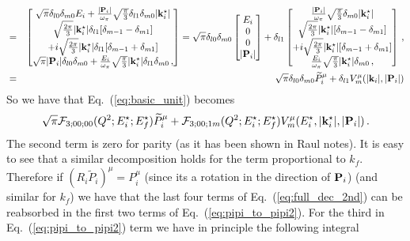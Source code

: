 {\begin{eqnarray}
&=&\begin{bmatrix} \sqrt{\pi}\delta_{l0}\delta_{m0}E_i + \tfrac{|\textbf{P}_i|}{\omega_\pi}\sqrt{\frac{\pi}{3}} \delta_{l1}\delta_{m 0}|{\bf k}^\star_i| \\ \sqrt{\frac{2 \pi}{3}} |{\bf k}^\star_i| \delta_{l1}[\delta_{m-1}-\delta_{m1}] \\ +i\sqrt{\frac{2 \pi}{3}} |{\bf k}^\star_i| \delta_{l1}[\delta_{m-1}+\delta_{m1}]  \\ \sqrt{\pi}|\textbf{P}_i|\delta_{l0} \delta_{m 0} + \tfrac{E_i}{\omega_\pi} \sqrt{\frac{\pi}{3}}|{\bf k}_i^\star|\delta_{l1}\delta_{m 0}\, , \end{bmatrix}=\sqrt{\pi}\delta_{l0}\delta_{m 0}\begin{bmatrix}
E_i\\ 0 \\ 0 \\|{\bf P}_i|
\end{bmatrix}+\delta_{l1}\begin{bmatrix} \tfrac{|\textbf{P}_i|}{\omega_\pi}\sqrt{\frac{\pi}{3}} \delta_{m 0}|{\bf k}^\star_i| \\ \sqrt{\frac{2 \pi}{3}} |{\bf k}^\star_i| [\delta_{m-1}-\delta_{m1}] \\ +i\sqrt{\frac{2 \pi}{3}} |{\bf k}^\star_i| [\delta_{m-1}+\delta_{m1}]  \\  \tfrac{E_i}{\omega_\pi} \sqrt{\frac{\pi}{3}}|{\bf k}_i^\star|\delta_{m 0}\, , \end{bmatrix}\, ,\nonumber\\
&=& \sqrt{\pi}\delta_{l0}\delta_{m 0}\widetilde{P}_i^\mu+\delta_{l1}V_m^\mu(|{\bf k}_i|,|{\bf P}_i|)
\end{eqnarray}
So we have that Eq.~(\ref{eq:basic_unit}) becomes
\begin{eqnarray}
\sqrt{\pi}{\cal F}_{3;00;00}(Q^2;E_i^\star;E_f^\star)\widetilde{P}^\mu_i+{\cal F}_{3;00;1m}(Q^2;E_i^\star;E_f^\star)V^\mu_m(E_i^\star,|{\bf k}^\star_i|,|{\bf P}_i|)\, .
\end{eqnarray}
The second term is zero for parity (as it has been shown in Raul notes).
It is easy to see that a similar decomposition holds for the term proportional to $k_f$.
Therefore if $(R_i \widetilde{P}_i)^\mu=P_i^\mu$ (since its a rotation in the direction of ${\bf P}_i$) (and similar for $k_f$) we have that the last four terms of Eq.~(\ref{eq:full_dec_2nd}) can be reabsorbed in the first two terms of Eq.~(\ref{eq:pipi_to_pipi2}). For the third in Eq.~(\ref{eq:pipi_to_pipi2}) term we have in principle the following integral
\begin{eqnarray}

\end{eqnarray}}

